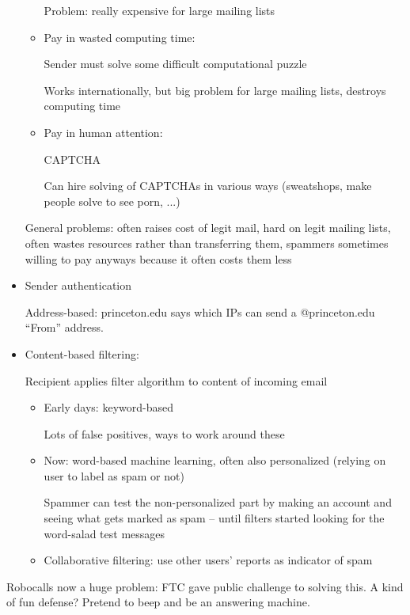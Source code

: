 \begin{itemize}
\begin{itemize}
                Problem: really expensive for large mailing lists
            \item Pay in wasted computing time:

                Sender must solve some difficult computational puzzle

                Works internationally, but big problem for large mailing lists,
                destroys computing time
            \item Pay in human attention:

                CAPTCHA %

                Can hire solving of CAPTCHAs in various ways (sweatshops, make people solve to see porn, ...)
        \end{itemize}
        General problems: often raises cost of legit mail, hard on legit mailing lists, often wastes resources rather than transferring them, spammers sometimes willing to pay anyways because it often costs them less
    \item Sender authentication

        Address-based: princeton.edu says which IPs can send a @princeton.edu ``From'' address. 
    \item Content-based filtering:

        Recipient applies filter algorithm to content of incoming email
        \begin{itemize}
            \item Early days: keyword-based

                Lots of false positives, ways to work around these
            \item Now: word-based machine learning, often also personalized
                (relying on user to label as spam or not)

                Spammer can test the non-personalized part by making an account
                and seeing what gets marked as spam -- until filters started
                looking for the word-salad test messages
            \item Collaborative filtering: use other users' reports as indicator of spam
        \end{itemize}
\end{itemize}

Robocalls now a huge problem: FTC gave public challenge to solving this. A kind of fun defense? Pretend to beep and be an answering machine.
